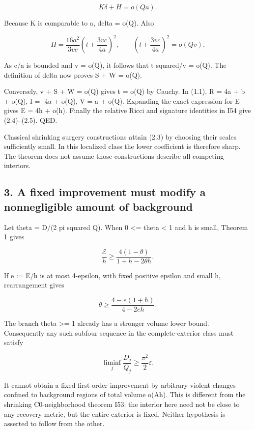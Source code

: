 \documentclass[
  10pt,
]{article}
\begin{document}
\[
 K\delta+H=o(Qa).
\]

Because K is comparable to a, delta = o(Q). Also

\[
 H=\frac{16a^2}{3vc}\left(t+\frac{3vc}{4a}\right)^2,
 \qquad
 \left(t+\frac{3vc}{4a}\right)^2=o(Qv).
\]

As c/a is bounded and v = o(Q), it follows that t squared/v = o(Q). The
definition of delta now proves S + W = o(Q).

Conversely, v + S + W = o(Q) gives t = o(Q) by Cauchy. In (1.1), R = 4a
+ b + o(Q), I = -4a + o(Q), V = a + o(Q). Expanding the exact expression
for E gives E = 4h + o(h). Finally the relative Ricci and signature
identities in I54 give (2.4)--(2.5). QED.

Classical shrinking surgery constructions attain (2.3) by choosing their
scales sufficiently small. In this localized class the lower coefficient
is therefore sharp. The theorem does not assume those constructions
describe all competing interiors.

\hypertarget{a-fixed-improvement-must-modify-a-nonnegligible-amount-of-background}{%
\subsection{3. A fixed improvement must modify a nonnegligible amount of
background}\label{a-fixed-improvement-must-modify-a-nonnegligible-amount-of-background}}

Let theta = D/(2 pi squared Q). When 0 \textless= theta \textless{} 1
and h is small, Theorem 1 gives

\[
 \frac{\mathcal E}{h}\ge
        \frac{4(1-\theta)}{1+h-2\theta h}.                \tag{3.1}
\]

If e := E/h is at most 4-epsilon, with fixed positive epsilon and small
h, rearrangement gives

\[
 \theta\ge\frac{4-e(1+h)}{4-2eh}.
\]

The branch theta \textgreater= 1 already has a stronger volume lower
bound. Consequently any such subfour sequence in the complete-exterior
class must satisfy

\[
 \boxed{\liminf_j\frac{D_j}{Q_j}
                       \ge\frac{\pi^2}{2}\varepsilon.}  \tag{3.2}
\]

It cannot obtain a fixed first-order improvement by arbitrary violent
changes confined to background regions of total volume o(Ah). This is
different from the shrinking C0-neighborhood theorem I53: the interior
here need not be close to any recovery metric, but the entire exterior
is fixed. Neither hypothesis is asserted to follow from the other.
\end{document}
